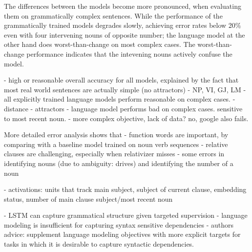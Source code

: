 The differences between the models become more pronounced,
when evaluating them on grammatically complex sentences.
While the performance of the grammatically trained models
degrades slowly, achieving error rates below 20\% even with
four intervening nouns of opposite number;
the language model at the other hand does worst-than-change
on most complex cases. The worst-than-change performance
indicates that the intevening nouns actively confuse
the model. 


- high or reasonable overall accuracy for all models, explained by the fact that most real world sentences are actually simple (no attractors)
   - NP, VI, GJ, LM
- all explicitly trained language models perform reasonable on complex cases.
   - distance
   - attractors
- language model performs bad on complex cases. sensitive to most recent noun.
  - more complex objective, lack of data? no, google also fails.

More detailed error analysis shows that
- function words are important, by comparing with a baseline model trained on noun verb sequences
- relative clauses are challenging, especially when relativizer misses
- some errors in identifying nouns (due to ambiguity: drives) and identifying the number of a noun

- activations: units that track main subject, subject of current clause, embedding status, number of main clause subject/most recent noun

- LSTM can capture grammatical structure given targeted supervision
- language modeling is insufficient for capturing syntax sensitive dependencies
- authors advice: supplement language modeling objectives with more explicit targets
for tasks in which it is desirable to capture syntactic dependencies.